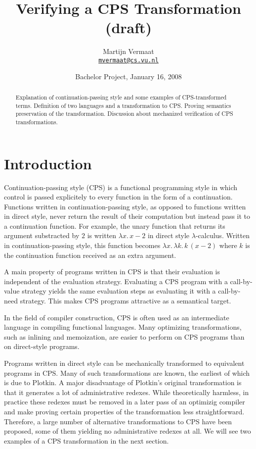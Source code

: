 \documentclass[a4paper,11pt,draft]{article}
\title{\sffamily Verifying a CPS Transformation (draft)}
\author{
  Martijn Vermaat\\[0.3em]
  \href{mailto:mvermaat@cs.vu.nl}{\texttt{mvermaat@cs.vu.nl}}
}
\date{Bachelor Project, January 16, 2008}
\begin{document}
\maketitle


\begin{abstract}
  Explanation of continuation-passing style and some examples of CPS-transformed
  terms. Definition of two languages and a transformation to CPS. Proving
  semantics preservation of the transformation. Discussion about mechanized
  verification of CPS transformations.
\end{abstract}


\section{Introduction}\label{sec:introduction}


Continuation-passing style (CPS) is a functional programming style in which control is
passed explicitely to every function in the form of a continuation. Functions
written in continuation-passing style, as opposed to functions written in direct
style, never return the result of their computation but instead pass it to a
continuation function. For example, the unary function that returns its argument
substracted by $2$ is written $\lambda x. \, x - 2$ in direct style
$\lambda$-calculus. Written in continuation-passing style, this function becomes
$\lambda x. \, \lambda k. \, k \, (x - 2)$ where $k$ is the continuation function
received as an extra argument.

A main property of programs written in CPS is that their evaluation is independent
of the evaluation strategy. Evaluating a CPS program with a call-by-value strategy
yields the same evaluation steps as evaluating it with a call-by-need strategy. This
makes CPS programs attractive as a semantical target.

In the field of compiler construction, CPS is often used as an intermediate language
in compiling functional languages. Many optimizing transformations, such as inlining
and memoization, are easier to perform on CPS programs than on direct-style programs.

Programs written in direct style can be mechanically transformed to equivalent
programs in CPS. Many of such transformations are known, the earliest of which is
due to Plotkin. A major disadvantage of Plotkin's original transformation is
that it generates a lot of administrative redexes. While theoretically harmless, in
practice these redexes must be removed in a later pass of an optimizig compiler and
make proving certain properties of the transformation less straightforward. Therefore,
a large number of alternative transformations to CPS have been proposed, some of them
yielding no administrative redexes at all. We will see two examples of a CPS
transformation in the next section.
\end{document}
